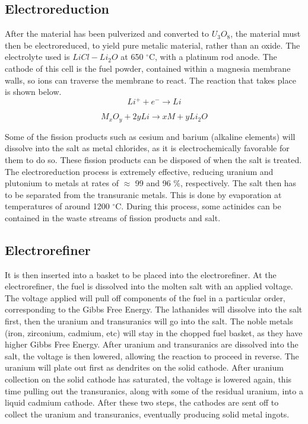 \subsection{Electroreduction}

After the material has been pulverized and converted to $U_3O_8$, the material must then be electroreduced, to yield pure metalic material, rather than an oxide. The electrolyte used is $LiCl-Li_2O$ at 650 $^{\circ}$C, with a platinum rod anode. The cathode of this cell is the fuel powder, contained within a magnesia membrane walls, so ions can traverse the membrane to react. The reaction that takes place is shown below. \\ 

\begin{equation}
Li^+ + e^- \rightarrow Li
\end{equation}

\begin{equation}
M_xO_y + 2yLi \rightarrow xM + yLi_2O
\end{equation}

Some of the fission products such as cesium and barium (alkaline elements) will dissolve into the salt as metal chlorides, as it is electrochemically favorable for them to do so. These fission products can be disposed of when the salt is treated. The electroreduction process is extremely effective, reducing uranium and plutonium to metals at rates of $\approx$ 99 and 96 \%, respectively. The salt then has to be separated from the transuranic metals. This is done by evaporation at temperatures of around 1200 $^{\circ}$C. During this process, some actinides can be contained in the waste streams of fission products and salt. \\

\subsection{Electrorefiner}
 It is then inserted into a basket to be placed into the electrorefiner. At the electrorefiner, the fuel is dissolved into the molten salt with an applied voltage. The voltage applied will pull off components of the fuel in a particular order, corresponding to the Gibbs Free Energy. The lathanides will dissolve into the salt first, then the  uranium and transuranics will go into the salt. The noble metals (iron, zirconium, cadmium, etc) will stay in the chopped fuel basket, as they have higher Gibbs Free Energy. After uranium and transuranics are dissolved into the salt, the voltage is then lowered, allowing the reaction to proceed in reverse. The uranium will plate out first as dendrites on the solid cathode. After uranium collection on the solid cathode has saturated, the voltage is lowered again, this time pulling out the transuranics, along with some of the residual uranium, into a liquid cadmium cathode. After these two steps, the cathodes are sent off to collect the uranium and transuranics, eventually producing solid metal ingots. \\

